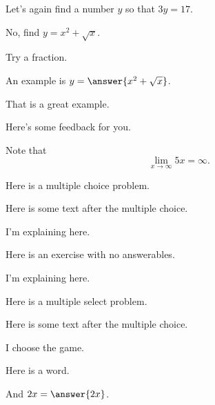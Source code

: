 \documentclass{ximera}
\begin{document}
\begin{exercise}
Let's again find a number $y$ so that $3y = 17$.

No, find $y = x^2 + \sqrt{x}$.

\begin{hint}
Try a fraction.
\end{hint}
An example is $y = \answer{x^2 + \sqrt{x}}$.

That is a great example.

\begin{feedback}
Here's some feedback for you.
\end{feedback}
\end{exercise}

Note that \[\lim_{x \to \infty} 5x = \infty.\]

\begin{exercise}
  Here is a multiple choice problem.

    \begin{multipleChoice}
    \end{multipleChoice}

  Here is some text after the multiple choice.

  \begin{explanation}
    I'm explaining here.
  \end{explanation}
\end{exercise}

\begin{exercise}
  Here is an exercise with no answerables.

  \begin{explanation}
    I'm explaining here.
  \end{explanation}
\end{exercise}

\begin{exercise}
  Here is a multiple select problem.

    \begin{selectAll}
    \end{selectAll}

  Here is some text after the multiple choice.
\end{exercise}

\begin{exercise}
  I choose  the game.
\end{exercise}

\begin{exercise}
  Here is a  word.

  And $2x = \answer{2x}$.
\end{exercise}
\end{document}
